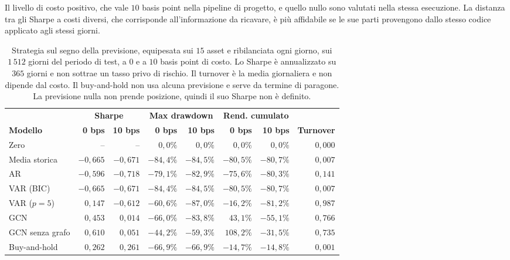 Il livello di costo positivo, che vale $10$ basis point nella pipeline di progetto, e quello nullo sono valutati nella stessa esecuzione. La distanza tra gli Sharpe a costi diversi, che corrisponde all'informazione da ricavare, è più affidabile se le sue parti provengono dallo stesso codice applicato agli stessi giorni.

\begin{table}[H]
\centering
\caption[Metriche economiche della strategia sul segno]{Strategia sul segno della previsione, equipesata sui $15$ asset e ribilanciata ogni giorno, sui $1\,512$ giorni del periodo di test, a $0$ e a $10$ basis point di costo. Lo Sharpe è annualizzato su $365$ giorni e non sottrae un tasso privo di rischio. Il turnover è la media giornaliera e non dipende dal costo. Il buy-and-hold non usa alcuna previsione e serve da termine di paragone. La previsione nulla non prende posizione, quindi il suo Sharpe non è definito.}
\label{tab:bt-backtest}
\small
\setlength{\tabcolsep}{4pt}
\begin{tabular}{@{}lrrrrrrr@{}}
\toprule
 & \multicolumn{2}{c}{\textbf{Sharpe}} & \multicolumn{2}{c}{\textbf{Max drawdown}} & \multicolumn{2}{c}{\textbf{Rend. cumulato}} & \\
\cmidrule(lr){2-3}\cmidrule(lr){4-5}\cmidrule(lr){6-7}
\textbf{Modello} & \textbf{0 bps} & \textbf{10 bps} & \textbf{0 bps} & \textbf{10 bps} & \textbf{0 bps} & \textbf{10 bps} & \textbf{Turnover} \\
\midrule
Zero & -- & -- & $0{,}0\%$ & $0{,}0\%$ & $0{,}0\%$ & $0{,}0\%$ & $0{,}000$ \\
Media storica & $-0{,}665$ & $-0{,}671$ & $-84{,}4\%$ & $-84{,}5\%$ & $-80{,}5\%$ & $-80{,}7\%$ & $0{,}007$ \\
AR & $-0{,}596$ & $-0{,}718$ & $-79{,}1\%$ & $-82{,}9\%$ & $-75{,}6\%$ & $-80{,}3\%$ & $0{,}141$ \\
VAR (BIC) & $-0{,}665$ & $-0{,}671$ & $-84{,}4\%$ & $-84{,}5\%$ & $-80{,}5\%$ & $-80{,}7\%$ & $0{,}007$ \\
VAR ($p=5$) & $0{,}147$ & $-0{,}612$ & $-60{,}6\%$ & $-87{,}0\%$ & $-16{,}2\%$ & $-81{,}2\%$ & $0{,}987$ \\
GCN & $0{,}453$ & $0{,}014$ & $-66{,}0\%$ & $-83{,}8\%$ & $43{,}1\%$ & $-55{,}1\%$ & $0{,}766$ \\
GCN senza grafo & $0{,}610$ & $0{,}051$ & $-44{,}2\%$ & $-59{,}3\%$ & $108{,}2\%$ & $-31{,}5\%$ & $0{,}735$ \\
Buy-and-hold & $0{,}262$ & $0{,}261$ & $-66{,}9\%$ & $-66{,}9\%$ & $-14{,}7\%$ & $-14{,}8\%$ & $0{,}001$ \\
\bottomrule
\end{tabular}
\end{table}

